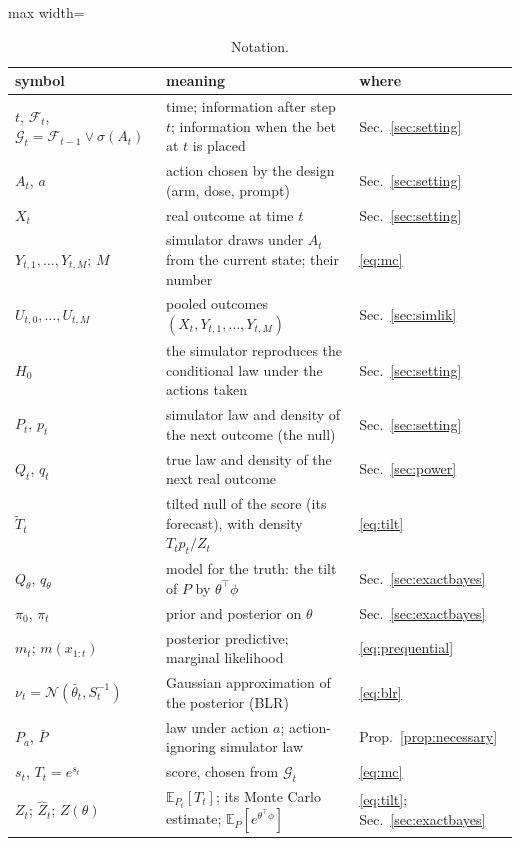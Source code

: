 \documentclass[11pt]{article}
\newcommand{\E}{\mathbb{E}}
\newcommand{\F}{\mathcal{F}}
\newcommand{\G}{\mathcal{G}}
\theoremstyle{remark}
\begin{document}
\begin{table}[h]
\centering
\caption{Notation. }
\label{tab:notation}
\begin{adjustbox}{max width=\textwidth}
\begin{tabular}{lll}
\toprule
symbol & meaning & where \\
\midrule
$t$, $\F_t$, $\G_t = \F_{t-1} \vee \sigma(A_t)$ & time; information after step $t$; information when the bet at $t$ is placed & Sec.~\ref{sec:setting} \\
$A_t$, $a$ & action chosen by the design (arm, dose, prompt) & Sec.~\ref{sec:setting} \\
$X_t$ & real outcome at time $t$ & Sec.~\ref{sec:setting} \\
$Y_{t,1}, \ldots, Y_{t,M}$; $M$ & simulator draws under $A_t$ from the current state; their number & \eqref{eq:mc} \\
$U_{t,0}, \ldots, U_{t,M}$ & pooled outcomes $(X_t, Y_{t,1}, \ldots, Y_{t,M})$ & Sec.~\ref{sec:simlik} \\
$H_0$ & the simulator reproduces the conditional law under the actions taken & Sec.~\ref{sec:setting} \\
\midrule
$P_t$, $p_t$ & simulator law and density of the next outcome (the null) & Sec.~\ref{sec:setting} \\
$Q_t$, $q_t$ & true law and density of the next real outcome & Sec.~\ref{sec:power} \\
$\tilde T_t$ & tilted null of the score (its forecast), with density $T_t p_t / Z_t$ & \eqref{eq:tilt} \\
$Q_\theta$, $q_\theta$ & model for the truth: the tilt of $P$ by $\theta^\top\phi$ & Sec.~\ref{sec:exactbayes} \\
$\pi_0$, $\pi_t$ & prior and posterior on $\theta$ & Sec.~\ref{sec:exactbayes} \\
$m_t$; $m(x_{1:t})$ & posterior predictive; marginal likelihood & \eqref{eq:prequential} \\
$\nu_t = \mathcal N(\bar\theta_t, S_t^{-1})$ & Gaussian approximation of the posterior (BLR) & \eqref{eq:blr} \\
$P_a$, $\bar P$ & law under action $a$; action-ignoring simulator law & Prop.~\ref{prop:necessary} \\
\midrule
$s_t$, $T_t = e^{s_t}$ & score, chosen from $\G_t$ & \eqref{eq:mc} \\
$Z_t$; $\widehat Z_t$; $Z(\theta)$ & $\E_{P_t}[T_t]$; its Monte Carlo estimate; $\E_P[e^{\theta^\top\phi}]$ & \eqref{eq:tilt}; Sec.~\ref{sec:exactbayes} \\

\end{tabular}
\end{adjustbox}
\end{table}
\end{document}
